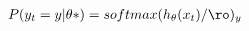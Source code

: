 \documentclass[preview]{standalone}
\begin{document}
\begin{align*}
P(y_t = y | \theta\ast) = softmax(h_{\theta}(x_t)/\ro)_y
\end{align*}
\end{document}
